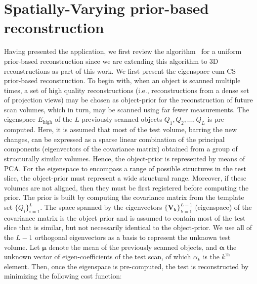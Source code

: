 \documentclass[journal]{IEEEtran}
\begin{document}
\begin{figure}[!h]
\label{fig:RFA2_very_few_views}
\end{figure}


\section{Spatially-Varying prior-based reconstruction}
\label{sec:method_spatially_varying_prior}
Having presented the application, we first review the algorithm~\cite{my_dicta_paper} for a uniform  prior-based reconstruction since we are extending this algorithm to 3D reconstructions as part of this work.
We first present the eigenspace-cum-CS prior-based reconstruction. To begin with, when an object is scanned multiple times, a set of high quality reconstructions (i.e., reconstructions from a dense set of projection views) may be chosen as object-prior for the reconstruction of future scan volumes, which in turn, may be scanned using far fewer measurements. The eigenspace $E_{\text{high}}$ of the $L$ previously scanned objects $Q_1,Q_2,...,Q_L$ is pre-computed. Here, it is assumed that most of the test volume, barring the new changes, can be expressed as a sparse linear combination of the principal components (eigenvectors of the covariance matrix) obtained from a group of structurally similar volumes. Hence, the object-prior is represented by means of PCA. For the eigenspace to encompass a range of possible structures in the test slice, the object-prior must represent a wide structural range. Moreover, if these volumes are not aligned, then they must be first registered before computing the prior. The prior is built by computing the covariance matrix from the template set $\{Q_i\}_{i=1}^L$. The space spanned by the eigenvectors $\{\boldsymbol{V_k}\}_{k=1}^{L-1}$ (eigenspace) of the covariance matrix is the object prior and is assumed to contain most of the test slice that is similar, but not necessarily identical to the object-prior. We use all of the $L-1$ orthogonal eigenvectors as a basis to represent the unknown test volume. Let $\boldsymbol{\mu}$ denote the mean of the previously scanned objects, and $\boldsymbol{\alpha}$ the unknown vector of eigen-coefficients of the test scan, of which $\alpha_k$ is the $k^{\textrm{th}}$ element. Then, once the eigenspace is pre-computed, the test is reconstructed by minimizing the following cost function:
\end{document}
